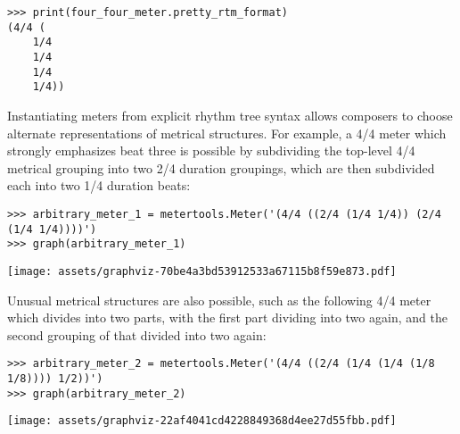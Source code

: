 \begin{singlespacing}
\vspace{-0.5\baselineskip}
\begin{lstlisting}
>>> print(four_four_meter.pretty_rtm_format)
(4/4 (
	1/4
	1/4
	1/4
	1/4))
\end{lstlisting}
\end{singlespacing}

Instantiating meters from explicit rhythm tree syntax allows composers to
choose alternate representations of metrical structures. For example, a 4/4
meter which strongly emphasizes beat three is possible by subdividing the
top-level 4/4 metrical grouping into two 2/4 duration groupings, which are then
subdivided each into two 1/4 duration beats:

\begin{comment}
<abjad>
arbitrary_meter_1 = metertools.Meter('(4/4 ((2/4 (1/4 1/4)) (2/4 (1/4 1/4))))')
graph(arbitrary_meter_1)
</abjad>
\end{comment}

\begin{singlespacing}
\vspace{-0.5\baselineskip}
\begin{lstlisting}
>>> arbitrary_meter_1 = metertools.Meter('(4/4 ((2/4 (1/4 1/4)) (2/4 (1/4 1/4))))')
>>> graph(arbitrary_meter_1)
\end{lstlisting}
\noindent\texttt{[image: assets/graphviz-70be4a3bd53912533a67115b8f59e873.pdf]}
\end{singlespacing}

\noindent Unusual metrical structures are also possible, such as the following
4/4 meter which divides into two parts, with the first part dividing into two
again, and the second grouping of that divided into two again:

\begin{comment}
<abjad>
arbitrary_meter_2 = metertools.Meter('(4/4 ((2/4 (1/4 (1/4 (1/8 1/8)))) 1/2))')
graph(arbitrary_meter_2)
</abjad>
\end{comment}

\begin{singlespacing}
\vspace{-0.5\baselineskip}
\begin{lstlisting}
>>> arbitrary_meter_2 = metertools.Meter('(4/4 ((2/4 (1/4 (1/4 (1/8 1/8)))) 1/2))')
>>> graph(arbitrary_meter_2)
\end{lstlisting}
\noindent\texttt{[image: assets/graphviz-22af4041cd4228849368d4ee27d55fbb.pdf]}
\end{singlespacing}

